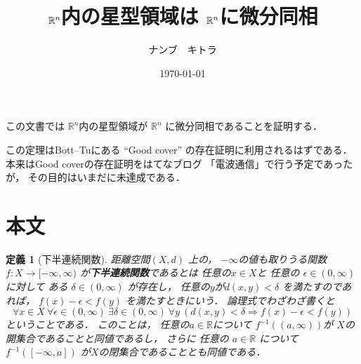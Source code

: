 \documentclass[leqno, a4paper, 12pt, dvipdfmx]{jsarticle}
\title{$\rr^{n}$内の星型領域は
$\rr^{n}$に微分同相}
\author{ナンブ　キトラ}
\date{\today}
\newtheorem{df}[thm]{定義}
\newcommand{\To}{\Longrightarrow}
\newcommand{\rr}{\mathbb{R}}
\begin{document}
\maketitle


この文書では
$\rr^{n}$内の星型領域が
$\rr^{n}$
に微分同相であることを証明する．

この定理はBott--Tuにある
``Good cover''
の存在証明に利用されるはずである．
本来はGood coverの存在証明をはてなブログ
「電波通信」で行う予定であったが，
その目的はいまだに未達成である．

\tableofcontents

\section{本文}
\begin{df}[下半連続関数]
距離空間$(X, d)$
上の，
$-\infty$の値も取りうる関数
$f\colon X\to [-\infty, \infty)$
が\textbf{下半連続関数}であるとは
任意の$x\in X$と
任意の
$\epsilon\in (0, \infty)$
に対して
ある
$\delta\in (0, \infty)$
が存在し，
任意の$y$が$d(x, y)<\delta$
を満たすのであれば，
$f(x)-\epsilon <f(y)$
を満たすときにいう．
論理式でわざわざ書くと
\[
\forall x\in X\ \forall \epsilon\in (0, \infty)\ 
\exists \delta \in (0, \infty) 
\ 
\forall y\ (d(x, y)<\delta\To f(x)-\epsilon<f(y))
\]
ということである．
このことは，
任意の$a\in \rr$について
$f^{-1}((a, \infty))$が
$X$の開集合であることと同値であるし，
さらに
任意の
$a\in \rr$
について
$f^{-1}([-\infty, a])$
が$X$の閉集合であることとも同値である．
\end{df}
\end{document}
